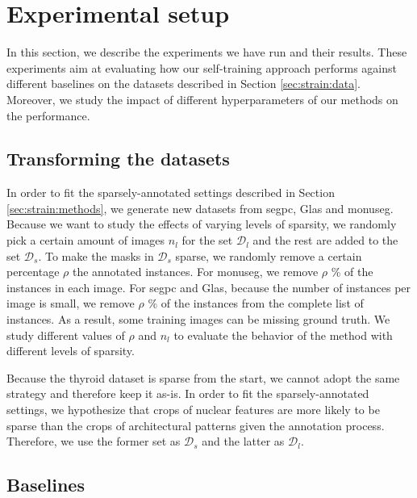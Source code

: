 \section{Experimental setup}
\label{sec:strain:experiments}

In this section, we describe the experiments we have run and their results. These experiments aim at evaluating how our self-training approach performs against different baselines on the datasets described in Section \ref{sec:strain:data}. Moreover, we study the impact of different hyperparameters of our methods on the performance.

\subsection{Transforming the datasets}

In order to fit the sparsely-annotated settings described in Section \ref{sec:strain:methods}, we generate new datasets from \acrshort{segpc}, Glas and \acrshort{monuseg}. Because we want to study the effects of varying levels of sparsity, we randomly pick a certain amount of images $n_l$ for the set $\mathcal{D}_l$ and the rest are added to the set $\mathcal{D}_s$. To make the masks in $\mathcal{D}_s$ sparse, we randomly remove a certain percentage $\rho$ the annotated instances. For \acrshort{monuseg}, we remove $\rho$ \% of the instances in each image. For \acrshort{segpc} and Glas, because the number of instances per image is small, we remove $\rho$ \% of the instances from the complete list of instances. As a result, some training images can be missing ground truth. We study different values of $\rho$ and $n_l$ to evaluate the behavior of the method with different levels of sparsity.

Because the thyroid dataset is sparse from the start, we cannot adopt the same strategy and therefore keep it as-is. In order to fit the sparsely-annotated settings, we hypothesize that crops of nuclear features are more likely to be sparse than the crops of architectural patterns given the annotation process. Therefore, we use the former set as $\mathcal{D}_s$ and the latter as $\mathcal{D}_l$.

\subsection{Baselines}

